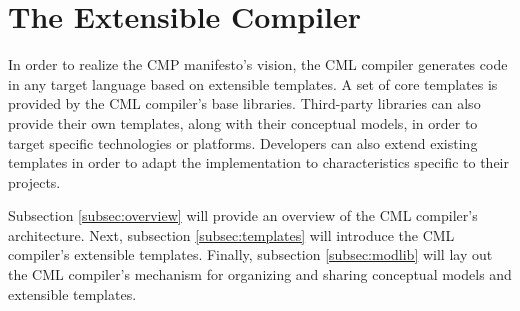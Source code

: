 \section{The Extensible Compiler}\label{sec:compiler}

In order to realize the CMP \cite{cmp} manifesto's vision,
the CML compiler generates code in any target language based on extensible templates.
A set of core templates is provided by the CML compiler's base libraries.
Third-party libraries can also provide their own templates,
along with their conceptual models,
in order to target specific technologies or platforms.
Developers can also extend existing templates in order to adapt the implementation to characteristics specific to their projects.

Subsection \ref{subsec:overview} will provide an overview of the CML compiler's architecture.
Next, subsection \ref{subsec:templates} will introduce the CML compiler's extensible templates.
Finally, subsection \ref{subsec:modlib} will lay out the CML compiler's mechanism for organizing and sharing conceptual models and extensible templates.




